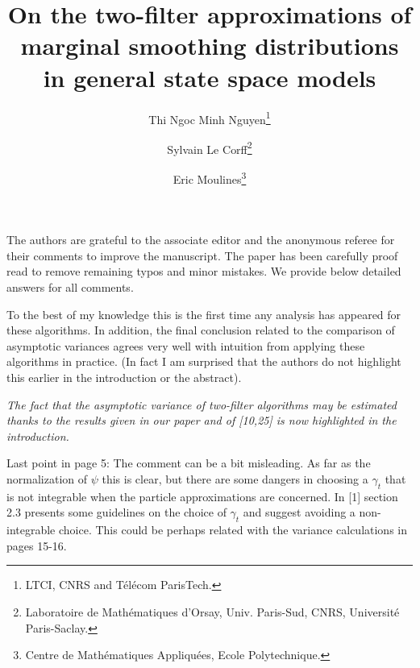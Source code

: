 \documentclass{article}
\begin{document}
\author{Thi Ngoc Minh Nguyen\footnote{LTCI, CNRS and T\'el\'ecom ParisTech.}\and Sylvain Le {C}orff\footnote{Laboratoire de Math\'ematiques d'Orsay, Univ. Paris-Sud, CNRS, Universit\'e Paris-Saclay.}\and Eric Moulines\footnote{Centre de Math\'ematiques Appliqu\'ees, Ecole Polytechnique.}}





\title{On the two-filter approximations of marginal smoothing distributions in general state space models}

\date{}

\maketitle


The authors are grateful to the associate editor and the anonymous referee for their comments to improve the manuscript. The paper has been carefully proof read to remove remaining typos and minor mistakes. We provide below detailed answers for all comments.


\vspace{1cm}


To the best of my knowledge this is the first time any analysis has appeared
for these algorithms. In addition, the final conclusion related to the comparison
of asymptotic variances agrees very well with intuition from applying these
algorithms in practice. (In fact I am surprised that the authors do not highlight
this earlier in the introduction or the abstract).

\vspace{.5cm}

{\em
The fact that the asymptotic variance of two-filter algorithms may be estimated thanks to the results given in our paper and of [10,25] is now highlighted in the introduction.
}


\vspace{1cm}

Last point in page 5: The comment can be a bit misleading. As far as the
normalization of $\psi$ this is clear, but there are some dangers in choosing a $\gamma_t$ that is not integrable when the particle approximations are concerned.
In [1] section 2.3 presents some guidelines on the choice of $\gamma_t$ and suggest
avoiding a non-integrable choice. This could be perhaps related with the
variance calculations in pages 15-16.

\vspace{.5cm}
\end{document}
